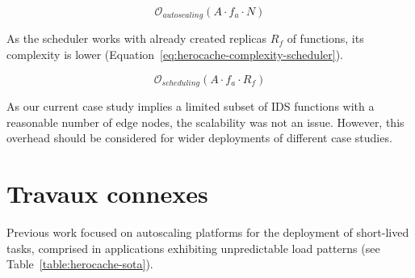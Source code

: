\begin{equation}
    \mathcal{O}_{autoscaling}(A \cdot f_{a} \cdot N)
\label{eq:herocache-complexity-autoscaler}
\end{equation}

As the scheduler works with already created replicas $R_{f}$ of functions, its complexity is lower (Equation~\ref{eq:herocache-complexity-scheduler}).

\begin{equation}
    \mathcal{O}_{scheduling}(A \cdot f_{a} \cdot R_{f})
\label{eq:herocache-complexity-scheduler}
\end{equation}

As our current case study implies a limited subset of IDS functions with a reasonable number of edge nodes, the scalability was not an issue. However, this overhead should be considered for wider deployments of different case studies.

\section{Travaux connexes}
\label{section:herocache-sota}

Previous work focused on autoscaling platforms for the deployment of short-lived tasks, comprised in applications exhibiting unpredictable load patterns (see Table~\ref{table:herocache-sota}).%

